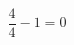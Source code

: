 \documentclass[preview]{standalone}
\begin{document}
\begin{align*}
\dfrac{4}{4}  -1 = 0
\end{align*}
\end{document}
